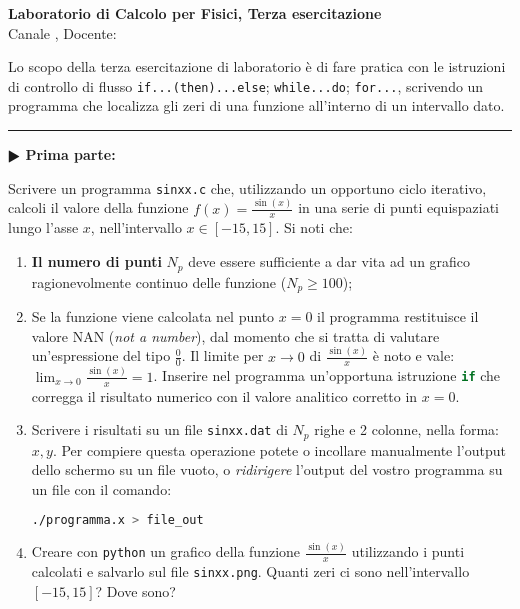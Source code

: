 \documentclass[11pt]{article}
\begin{document}
\pagestyle{empty}

\begin{center}
{\Large \bf  Laboratorio di Calcolo per Fisici, Terza esercitazione\\[2mm]}
{\large Canale \canale, Docente: \docente}
\end{center}
\vspace{4mm}

\begin{mdframed}[backgroundcolor=panna]
  Lo scopo della terza esercitazione di laboratorio \`e di fare pratica con
  le istruzioni di controllo di flusso \texttt{if...(then)...else}; \texttt{while...do};
\texttt{for...}, scrivendo un programma che localizza gli zeri di una funzione
all'interno di un intervallo dato.
  \end{mdframed}
%
%

\hrule
\vspace{2mm}
\textbf{$\RHD$ Prima parte:}

Scrivere un programma \texttt{sinxx.c} che, utilizzando un opportuno ciclo iterativo,
calcoli il valore della funzione $f(x)=\frac{\sin(x)}{x}$ in una serie di
punti equispaziati lungo l'asse $x$, nell'intervallo $x \in \left[-15,15 \right]$.
Si noti che:
\begin{enumerate}
\item  {\bf Il numero di punti} $N_{p}$ deve essere sufficiente a dar vita ad un grafico ragionevolmente continuo delle funzione ($N_p \ge 100$);
\item Se la funzione viene calcolata nel punto $x=0$ il programma restituisce il valore NAN (\emph{not a number}), 
dal momento che si tratta di valutare un'espressione del tipo $\frac{0}{0}$. Il limite per $x \to 0$ di 
$\frac{\sin(x)}{x}$ \`e noto e vale: $\lim_{x \to 0} \frac{\sin(x)}{x} = 1$.
Inserire nel programma un'opportuna  istruzione \lstinline[language=c]!if! che corregga il risultato numerico con il valore analitico corretto in $x=0$.
\item Scrivere i risultati su un file \texttt{sinxx.dat} di $N_p$ righe e 2 colonne, nella forma: $x,y$. Per compiere questa operazione potete o incollare manualmente l'output dello schermo su un file vuoto, o {\em ridirigere\/} l'output
del vostro programma su un file con il comando:
\\
\begin{lstlisting}[numbers=none,language=bash]
./programma.x > file_out
\end{lstlisting}
\item Creare con \texttt{python} un grafico della funzione $\frac{\sin(x)}{x}$
utilizzando i punti calcolati e salvarlo sul file \texttt{sinxx.png}. 
 Quanti zeri ci sono nell'intervallo $\left[ -15,15 \right]$? Dove sono?
\end{enumerate}
\end{document}
